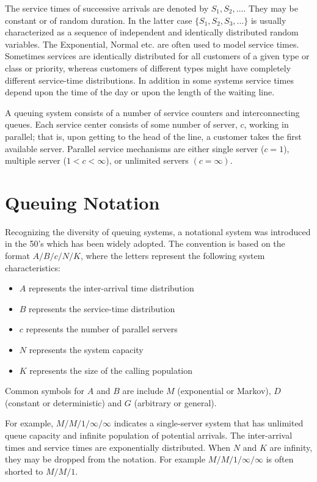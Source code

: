 \documentclass[
]{book}
\begin{document}
The service times of successive arrivals are denoted by \(S_1,S_2,\dots\). They may be constant or of random duration. In the latter case \(\{S_1,S_2,S_3,...\}\) is usually characterized as a sequence of independent and identically distributed random variables. The Exponential, Normal etc. are often used to model service times. Sometimes services are identically distributed for all customers of a given type or class or priority, whereas customers of different types might have completely different service-time distributions. In addition in some systems service times depend upon the time of the day or upon the length of the waiting line.

A queuing system consists of a number of service counters and interconnecting queues. Each service center consists of some number of server, \(c\), working in parallel; that is, upon getting to the head of the line, a customer takes the first available server. Parallel service mechanisms are either single server (\(c=1\)), multiple server (\(1<c<\infty\)), or unlimited servers \((c=\infty)\).

\hypertarget{queuing-notation}{%
\section{Queuing Notation}\label{queuing-notation}}

Recognizing the diversity of queuing systems, a notational system was introduced in the 50's which has been widely adopted. The convention is based on the format \(A/B/c/N/K\), where the letters represent the following system characteristics:

\begin{itemize}
\item
  \(A\) represents the inter-arrival time distribution
\item
  \(B\) represents the service-time distribution
\item
  \(c\) represents the number of parallel servers
\item
  \(N\) represents the system capacity
\item
  \(K\) represents the size of the calling population
\end{itemize}

Common symbols for \(A\) and \(B\) are include \(M\) (exponential or Markov), \(D\) (constant or deterministic) and \(G\) (arbitrary or general).

For example, \(M/M/1/\infty/\infty\) indicates a single-server system that has unlimited queue capacity and infinite population of potential arrivals. The inter-arrival times and service times are exponentially distributed. When \(N\) and \(K\) are infinity, they may be dropped from the notation. For example \(M/M/1/\infty/\infty\) is often shorted to \(M/M/1\).
\end{document}
